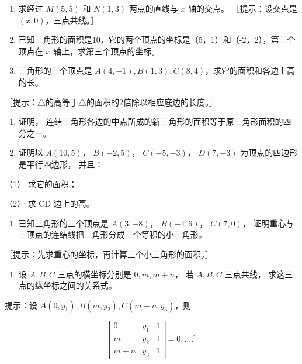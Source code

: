 \begin{enumerate}
\def\labelenumi{\arabic{enumi}.}
\setcounter{enumi}{1}
\item
  求经过 \(M(5, 5)\) 和 \(N(1, 3)\) 两点的直线与 \(x\) 轴的交点。
  ［提示：设交点是 \((x, 0)\)，三点共线。］
\item
  已知三角形的面积是10，它的两个顶点的坐标是（5，1）和（-2，2），第三个顶点在
  \(x\) 轴上，求第三个顶点的坐标。
\item
  三角形的三个顶点是
  \(A(4, -1), B(1, 3), C(8, 4)\)，求它的面积和各边上高的长。
\end{enumerate}

［提示：△的高等于△的面积的2倍除以相应底边的长度。］

\begin{enumerate}
\def\labelenumi{\arabic{enumi}.}
\setcounter{enumi}{4}
\item
  证明，
  连结三角形各边的中点所成的新三角形的面积等于原三角形面积的四分之一。
\item
  证明以 \(A(10, 5)\)， \(B(-2, 5)\)， \(C(-5, -3)\)， \(D(7, -3)\)
  为顶点的四边形是平行四边形， 并且：
\end{enumerate}

（1） 求它的面积；

（2） 求 CD 边上的高。

\begin{enumerate}
\def\labelenumi{\arabic{enumi}.}
\setcounter{enumi}{6}
\tightlist
\item
  已知三角形的三个顶点是 \(A(3, -8)\)， \(B(-4, 6)\)， \(C(7, 0)\)，
  证明重心与三顶点的连结线把三角形分成三个等积的小三角形。
\end{enumerate}

［提示：先求重心的坐标，再计算三个小三角形的面积。］

\begin{enumerate}
\def\labelenumi{\arabic{enumi}.}
\setcounter{enumi}{7}
\tightlist
\item
  设 \(A, B, C\) 三点的横坐标分别是 \(0, m, m + n\)， 若 \(A, B, C\)
  三点共线， 求这三点的纵坐标之间的关系式。
\end{enumerate}

提示：设 \(A(0, y_1), B(m, y_2), C(m + n, y_3)\)，则

\[
\left| \begin{array}{ccc} 0 & y_{1} & 1 \\ m & y_{2} & 1 \\ m + n & y_{3} & 1 \end{array} \right| = 0, \dots. ]
\]

